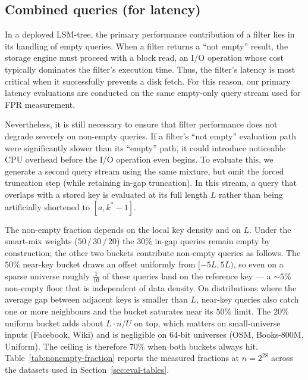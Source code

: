 \subsection{Combined queries (for latency)}
\label{subsec:queries-combined}

In a deployed LSM-tree, the primary performance contribution of a filter
lies in its handling of empty queries. When a filter returns a
``not empty'' result, the storage engine must proceed with a block read,
an I/O operation whose cost typically dominates the filter's execution time.
Thus, the filter's latency is most critical when it successfully prevents
a disk fetch. For this reason, our primary latency evaluations are
conducted on the same empty-only query stream used for FPR measurement.

Nevertheless, it is still necessary to ensure that filter performance does
not degrade severely on non-empty queries. If a filter's ``not empty''
evaluation path were significantly slower than its ``empty'' path, it could
introduce noticeable CPU overhead before the I/O operation even begins.
To evaluate this, we generate a second query stream using the same mixture,
but omit the forced truncation step (while retaining in-gap truncation).
In this stream, a query that overlaps with a stored key is evaluated at
its full length $L$ rather than being artificially shortened to $[a, k^* - 1]$.

The non-empty fraction depends on the local key density and on
$L$. Under the smart-mix weights ($50\,/\,30\,/\,20$) the $30\%$
in-gap queries remain empty by construction; the other two
buckets contribute non-empty queries as follows.
The $50\%$ near-key bucket draws an offset uniformly from
$[-5L, 5L)$, so even on a sparse universe roughly
$\tfrac{1}{10}$ of these queries land on the reference key ---
a $\sim\!5\%$ non-empty floor that is independent of data density.
On distributions where the average gap between adjacent keys is
smaller than $L$, near-key queries also catch one or more
neighbours and the bucket saturates near its $50\%$
limit.
The $20\%$ uniform bucket adds about $L \cdot n / U$ on top, which
matters on small-universe inputs (Facebook, Wiki) and is
negligible on $64$-bit universes (OSM, Books-800M, Uniform).
The ceiling is therefore $70\%$ when both buckets always hit.
Table~\ref{tab:nonempty-fraction} reports the measured fractions
at $n = 2^{28}$ across the datasets used in
Section~\ref{sec:eval-tables}.

